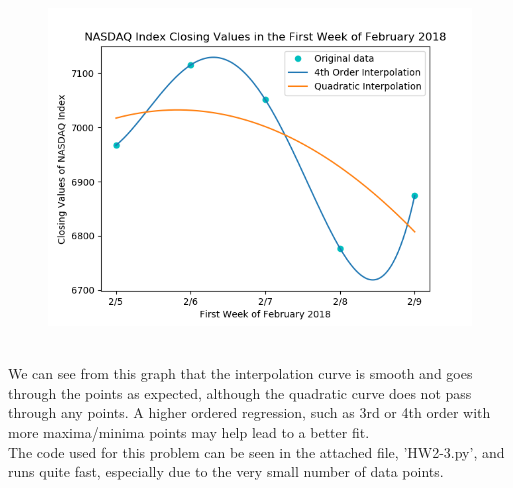 \documentclass[12pt]{article}
\begin{document}
\begin{figure}[h]
	\begin{center}
		\includegraphics*[scale=.6]{hw2-3plot.png}
	\end{center}
\end{figure}
\\We can see from this graph that the interpolation curve is smooth and goes through the points as expected, although the quadratic curve does not pass through any points. A higher ordered regression, such as 3rd or 4th order with more maxima/minima points may help lead to a better fit.
\\The code used for this problem can be seen in the attached file, 'HW2-3.py', and runs quite fast, especially due to the very small number of data points. 
\end{document}

